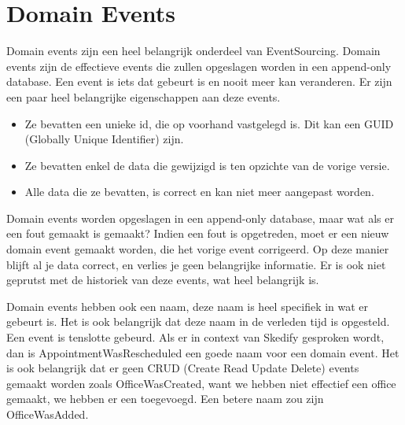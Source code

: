 
\section{Domain Events}
\label{sec:domain-events}

Domain events zijn een heel belangrijk onderdeel van EventSourcing. Domain events zijn de effectieve events die zullen opgeslagen worden in een append-only database. Een event is iets dat gebeurt is en nooit meer kan veranderen. Er zijn een paar heel belangrijke eigenschappen aan deze events.

\begin{itemize}
  \item{Ze bevatten een unieke id, die op voorhand vastgelegd is. Dit kan een GUID (Globally Unique Identifier) zijn.}
  \item{Ze bevatten enkel de data die gewijzigd is ten opzichte van de vorige versie.}
  \item{Alle data die ze bevatten, is correct en kan niet meer aangepast worden.}
\end{itemize}

Domain events worden opgeslagen in een append-only database, maar wat als er een fout gemaakt is gemaakt?
Indien een fout is opgetreden, moet er een nieuw domain event gemaakt worden, die het vorige event corrigeerd. Op deze manier blijft al je data correct, en verlies je geen belangrijke informatie. Er is ook niet geprutst met de historiek van deze events, wat heel belangrijk is.

Domain events hebben ook een naam, deze naam is heel specifiek in wat er gebeurt is. Het is ook belangrijk dat deze naam in de verleden tijd is opgesteld. Een event is tenslotte gebeurd. Als er in context van Skedify gesproken wordt, dan is AppointmentWasRescheduled een goede naam voor een domain event. Het is ook belangrijk dat er geen CRUD (Create Read Update Delete) events gemaakt worden zoals OfficeWasCreated, want we hebben niet effectief een office gemaakt, we hebben er een toegevoegd. Een betere naam zou zijn OfficeWasAdded.
